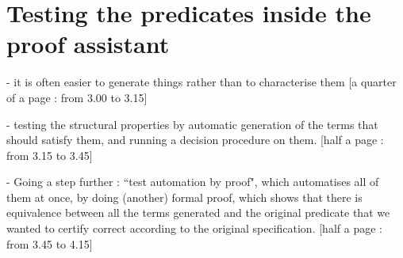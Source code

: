 
\section{Testing the predicates inside the proof assistant}

- it is often easier to generate things rather than to characterise them 
[a quarter of a page : from 3.00 to 3.15]

- testing the structural properties by automatic generation of the terms that should satisfy them, and running a decision procedure on them.
[half a page : from 3.15 to 3.45]

- Going a step further : ``test automation by proof", which automatises all of them at once, by doing (another) formal proof, which shows that there is equivalence between all the terms generated and the original predicate that we wanted to certify correct according to the original specification.
[half a page : from 3.45 to 4.15]
